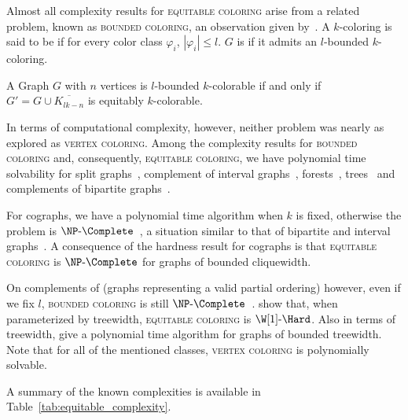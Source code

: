 Almost all complexity results for \textsc{equitable coloring} arise from a related problem, known as \textsc{bounded coloring}, an observation given by~\citep{equitable_treewidth}.
A $k$-coloring is said to be  if for every color class $\varphi_i$, $|\varphi_i| \leq l$.
$G$ is  if it admits an $l$-bounded $k$-coloring.


\begin{observation*}
    A Graph $G$ with $n$ vertices is $l$-bounded $k$-colorable if and only if $G' = G \cup \overline{K_{lk - n}}$ is equitably $k$-colorable.
\end{observation*}


In terms of computational complexity, however, neither problem was nearly as explored as \textsc{vertex coloring}.
Among the complexity results for \textsc{bounded coloring} and, consequently, \textsc{equitable coloring}, we have polynomial time solvability for split graphs~\citep{equitable_split}, complement of interval graphs~\citep{graph_partitioning1}, forests~\citep{mutual_exclusion_scheduling}, trees~\citep{equitable_trees} and complements of bipartite graphs~\citep{graph_partitioning1}.

For cographs, we have a polynomial time algorithm when $k$ is fixed, otherwise the problem is $\NPc$~\citep{graph_partitioning1}, a situation similar to that of bipartite and interval graphs~\citep{graph_partitioning1}.
A consequence of the hardness result for cographs is that \textsc{equitable coloring} is $\NPc$ for graphs of bounded cliquewidth.

On complements of  (graphs representing a valid partial ordering) however, even if we fix $l$, \textsc{bounded coloring} is still $\NPc$~\citep{chain_antichain}.
\citep{colorful_treewidth} show that, when parameterized by treewidth, \textsc{equitable coloring} is $\W[1]\text{-}\Hard$.
Also in terms of treewidth, \citep{equitable_treewidth} give a polynomial time algorithm for graphs of bounded treewidth.
Note that for all of the mentioned classes, \textsc{vertex coloring} is polynomially solvable.

A summary of the known complexities is available in Table~\ref{tab:equitable_complexity}.


